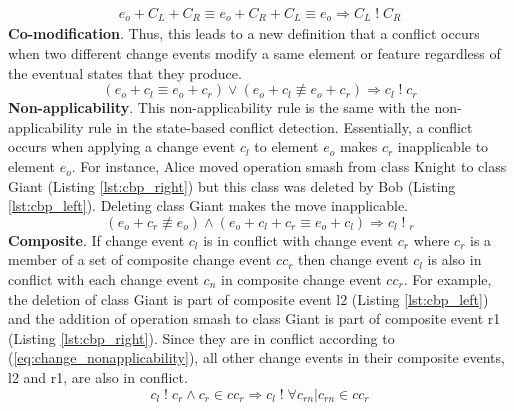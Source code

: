 \begin{equation} \label{eq:ecbp_equal_to_original_states}
\begin{split}
e_{o} + C_{L} + C_{R} \equiv e_{o} + C_{R} + C_{L} \equiv e_{o}  \Rightarrow C_{L}\;!\;C_{R}
\end{split}
\end{equation} 
\textbf{Co-modification}. Thus, this leads to a new definition that a conflict occurs when two different change events modify a same element or feature regardless of the eventual states that they produce. 
\begin{equation} \label{eq:change_comodifiabilty}
(e_{o} + c_{l} \equiv e_{o} + c_{r}) \vee (e_{o} + c_{l} \not\equiv e_{o} + c_{r}) \Rightarrow c_{l}\;!\;c_{r}
\end{equation} 
\textbf{Non-applicability}. This non-applicability rule is the same with the non-applicability rule in the state-based conflict detection. Essentially, a conflict occurs when applying a change event $c_{l}$ to element $e_{o}$ makes $c_{r}$ inapplicable to element $e_{o}$. For instance, Alice moved operation \textsf{smash} from class \textsf{Knight} to class \textsf{Giant} (Listing \ref{lst:cbp_right}) but this class was deleted by Bob (Listing \ref{lst:cbp_left}). Deleting class \textsf{Giant} makes the move inapplicable. 
\begin{equation} \label{eq:change_nonapplicability}
(e_{o} + c_{r} \not\equiv e_{o}) \wedge (e_{o} + c_{l} + c_{r} \equiv e_{o} + c_{l}) \Rightarrow c_{l}\;!\;_{r}
\end{equation}
\textbf{Composite}. If change event $c_{l}$ is in conflict with change event $c_{r}$ where $c_{r}$ is a member of a set of composite change event $cc_{r}$ then change event $c_{l}$ is also in conflict with each change event $c_{n}$ in composite change event $cc_{r}$. For example, the deletion of class \textsf{Giant} is part of composite event \textsf{l2} (Listing \ref{lst:cbp_left}) and the addition of operation \textsf{smash} to class \textsf{Giant} is part of composite event \textsf{r1} (Listing \ref{lst:cbp_right}). Since they are in conflict according to (\ref{eq:change_nonapplicability}), all other change events in their composite events, \textsf{l2} and \textsf{r1}, are also in conflict.
\begin{equation} \label{eq:change_composite}
c_{l}\;!\;c_{r} \wedge c_{r} \in cc_{r} \Rightarrow c_{l}\;!\; \forall c_{rn} | c_{rn} \in cc_{r}
\end{equation}

